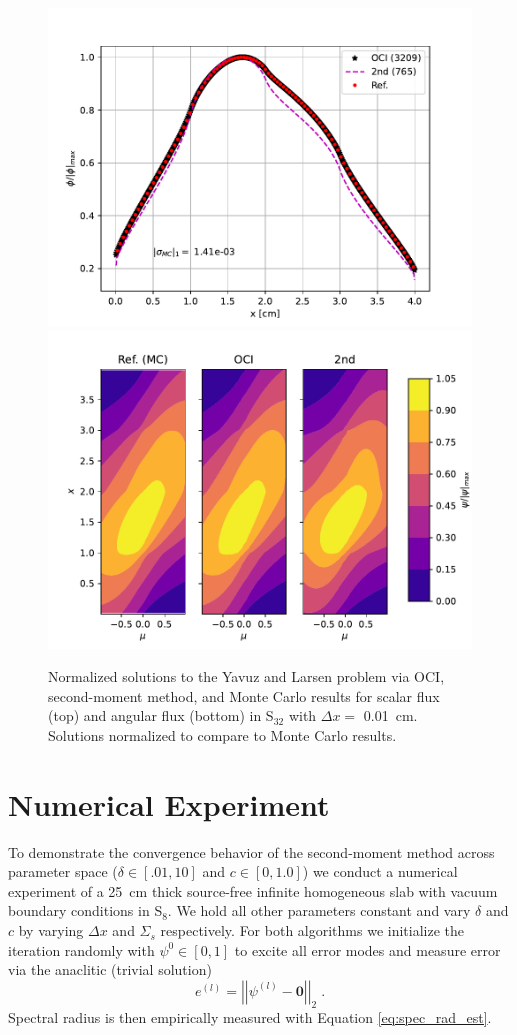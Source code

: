 \begin{figure}
    \centering
    \includegraphics[width=.75\linewidth]{figures/smm_paper/yavuz_normalized_fluxes.pdf}
    \includegraphics[width=.75\linewidth]{figures/smm_paper/yavuz_af.pdf}
    \caption{Normalized solutions to the Yavuz and Larsen problem via OCI, second-moment method, and Monte Carlo results for scalar flux (top) and angular flux (bottom) in S$_{32}$ with $\Delta x =$ \SI{0.01}{\centi\meter}. Solutions normalized to compare to Monte Carlo results.}
    \label{fig:yavuz}
\end{figure}

\section{Numerical Experiment}
\label{sec:num_exp}

To demonstrate the convergence behavior of the second-moment method across parameter space ($\delta \in [.01,10]$ and $c \in [0,1.0]$) we conduct a numerical experiment of a \SI{25}{\centi\meter} thick source-free infinite homogeneous slab with vacuum boundary conditions in S$_8$.
We hold all other parameters constant and vary $\delta$ and $c$ by varying $\Delta x$ and $\Sigma_s$ respectively.
For both algorithms we initialize the iteration randomly with $\psi^{0} \in [0, 1]$ to excite all error modes and measure error via the anaclitic (trivial solution)
\begin{equation}
    e^{(l)} = \left|\left|\psi^{(l)} - \bm{0}\right|\right|_2 \;.
\end{equation}
Spectral radius is then empirically measured with Equation \eqref{eq:spec_rad_est}.

